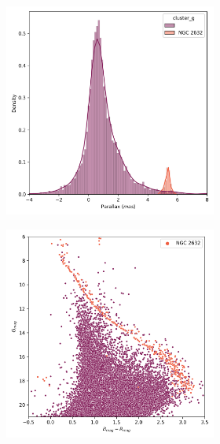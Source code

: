 \documentclass[11pt,a4paper,english,twocolumn]{article}
\begin{document}
\begin{figure}[htbp]
\begin{subfigure}{\columnwidth}
\begin{subfigure}[t]{0.30\textwidth}
      \includegraphics[width=\textwidth]{../figures/ngc_2632/parallax_ngc_2632.png}
    \end{subfigure}
    \hfill
    \begin{subfigure}[t]{0.30\textwidth}
      \centering
      \includegraphics[width=\textwidth]{../figures/ngc_2632/hr_diagram_ngc_2632.png}

\end{subfigure}
\end{subfigure}
\end{figure}
\end{document}
